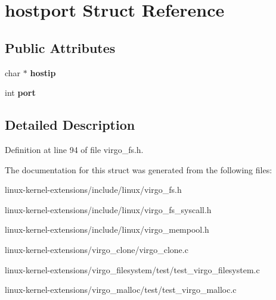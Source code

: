 \hypertarget{structhostport}{\section{hostport Struct Reference}
\label{structhostport}
}
\subsection*{Public Attributes}
\begin{DoxyCompactItemize}
\item 
\hypertarget{structhostport_a227f4b9328d4579469ef4d13ad8febbb}{char $\ast$ {\bfseries hostip}}\label{structhostport_a227f4b9328d4579469ef4d13ad8febbb}

\item 
\hypertarget{structhostport_a00ba3f5c4c9ab3246ec36c1a4a06448d}{int {\bfseries port}}\label{structhostport_a00ba3f5c4c9ab3246ec36c1a4a06448d}

\end{DoxyCompactItemize}


\subsection{Detailed Description}


Definition at line 94 of file virgo\-\_\-fs.\-h.



The documentation for this struct was generated from the following files\-:\begin{DoxyCompactItemize}
\item 
linux-\/kernel-\/extensions/include/linux/virgo\-\_\-fs.\-h\item 
linux-\/kernel-\/extensions/include/linux/virgo\-\_\-fs\-\_\-syscall.\-h\item 
linux-\/kernel-\/extensions/include/linux/virgo\-\_\-mempool.\-h\item 
linux-\/kernel-\/extensions/virgo\-\_\-clone/virgo\-\_\-clone.\-c\item 
linux-\/kernel-\/extensions/virgo\-\_\-filesystem/test/test\-\_\-virgo\-\_\-filesystem.\-c\item 
linux-\/kernel-\/extensions/virgo\-\_\-malloc/test/test\-\_\-virgo\-\_\-malloc.\-c\end{DoxyCompactItemize}
